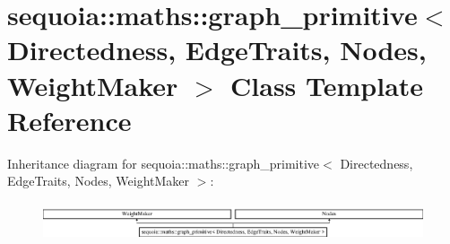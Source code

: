 \hypertarget{classsequoia_1_1maths_1_1graph__primitive}{}\section{sequoia\+::maths\+::graph\+\_\+primitive$<$ Directedness, Edge\+Traits, Nodes, Weight\+Maker $>$ Class Template Reference}
\label{classsequoia_1_1maths_1_1graph__primitive}
Inheritance diagram for sequoia\+::maths\+::graph\+\_\+primitive$<$ Directedness, Edge\+Traits, Nodes, Weight\+Maker $>$\+:\begin{figure}[H]
\begin{center}
\leavevmode
\includegraphics[height=1.145194cm]{classsequoia_1_1maths_1_1graph__primitive}
\end{center}
\end{figure}

